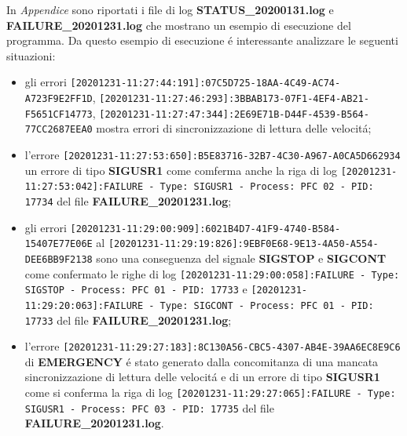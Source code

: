 \documentclass[11pt, oneside]{article}   	%
\begin{document}
In \textit{Appendice} sono riportati i file di log \textbf{STATUS\_20200131.log} e \textbf{FAILURE\_20201231.log} che mostrano un esempio di esecuzione del programma. Da questo esempio di esecuzione \'e interessante analizzare le seguenti situazioni:
\begin{itemize}
	\item gli errori \texttt{[20201231-11:27:44:191]:07C5D725-18AA-4C49-AC74-A723F9E2FF1D}, \texttt{[20201231-11:27:46:293]:3BBAB173-07F1-4EF4-AB21-F5651CF14773}, \texttt{[20201231-11:27:47:344]:2E69E71B-D44F-4539-B564-77CC2687EEA0}  mostra errori di sincronizzazione di lettura delle velocit\'a;
	\item l'errore \texttt{[20201231-11:27:53:650]:B5E83716-32B7-4C30-A967-A0CA5D662934} un errore di tipo \textbf{SIGUSR1} come comferma anche la riga di log \texttt{[20201231-11:27:53:042]:FAILURE - Type: SIGUSR1 - Process: PFC 02 - PID: 17734} del file \textbf{FAILURE\_20201231.log};
	\item gli errori \texttt{[20201231-11:29:00:909]:6021B4D7-41F9-4740-B584-15407E77E06E} al  \texttt{[20201231-11:29:19:826]:9EBF0E68-9E13-4A50-A554-DEE6BB9F2138} sono una conseguenza del signale \textbf{SIGSTOP} e \textbf{SIGCONT} come confermato le righe di log \texttt{[20201231-11:29:00:058]:FAILURE - Type: SIGSTOP - Process: PFC 01 - PID: 17733} e \texttt{[20201231-11:29:20:063]:FAILURE - Type: SIGCONT - Process: PFC 01 - PID: 17733} del file \textbf{FAILURE\_20201231.log};
	\item l'errore \texttt{[20201231-11:29:27:183]:8C130A56-CBC5-4307-AB4E-39AA6EC8E9C6}  di \textbf{EMERGENCY} \'e stato generato dalla concomitanza di una mancata sincronizzazione di lettura delle velocit\'a e di un errore di tipo \textbf{SIGUSR1} come si conferma la riga di log \texttt{[20201231-11:29:27:065]:FAILURE - Type: SIGUSR1 - Process: PFC 03 - PID: 17735} del file \textbf{FAILURE\_20201231.log}.
\end{itemize}

\newpage
\end{document}
